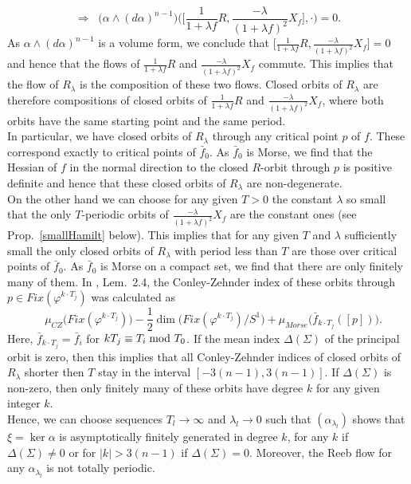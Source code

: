 \documentclass[a4paper,12pt,bibliography=totocnumbered,titlepage=false,abstracton,bookmarksnumbered=true]{scrartcl}
\theoremstyle{definition}
\begin{document}
 \[\Rightarrow\;\;\big(\alpha\wedge(d\alpha)^{n-1}\big)\Big(\big[{\textstyle\frac{1}{1+\lambda f}}R, {\textstyle\frac{-\lambda}{(1+\lambda f)^2}} X_{f}\big],\cdot\Big) =0.\]
As $\alpha{\wedge}(d\alpha)^{n-1}$ is a volume form, we conclude that $\big[{\textstyle\frac{1}{1+\lambda f}}R, {\textstyle\frac{-\lambda}{(1+\lambda f)^2}} X_{f}\big]=0$ and hence that the flows of $\frac{1}{1+\lambda f}R$ and $\frac{-\lambda}{(1+\lambda f)^2}X_f$ commute. This implies that the flow of $R_\lambda$ is the composition of these two flows. Closed orbits of $R_\lambda$ are therefore compositions of closed orbits of $\frac{1}{1+\lambda f}R$ and $\frac{-\lambda}{(1+\lambda f)^2}X_f$, where both orbits have the same starting point and the same period.\\
In particular, we have closed orbits of $R_\lambda$ through any critical point $p$ of $f$. These correspond exactly to critical points of $\bar{f}_0$. As $\bar{f}_0$ is Morse, we find that the Hessian of $f$ in the normal direction to the closed $R$-orbit through $p$ is positive definite and hence that these closed orbits of $R_\lambda$ are non-degenerate.\\
On the other hand we can choose for any given $T>0$ the constant $\lambda$ so small that the only $T$-periodic orbits of $\frac{-\lambda}{(1+\lambda f)^2}X_f$ are the constant ones (see Prop.\ \ref{smallHamilt} below). This implies that for any given $T$ and $\lambda$ sufficiently small the only closed orbits of $R_\lambda$ with period less than $T$ are those over critical points of $\bar{f}_0$. As $\bar{f}_0$ is Morse on a compact set, we find that there are only finitely many of them. In \cite{Bour}, Lem.\ 2.4, the Conley-Zehnder index of these orbits through $p\in Fix(\varphi^{k\cdot T_j})$ was calculated as 
\[\quad\mu_{CZ}\big(Fix(\varphi^{k\cdot T_j})\Big)-{\textstyle \frac{1}{2}}\dim\big(Fix(\varphi^{k\cdot T_j})\big/ S^1\big)+\mu_{Morse} \big(\bar{f}_{k\cdot T_j}([p])\big).\]
Here, $\bar{f}_{k\cdot T_j}=\bar{f}_i$ for $k T_j\equiv T_i \mspace{-7mu}\mod T_0$. If the mean index $\Delta(\Sigma)$ of the principal orbit is zero, then this implies that all Conley-Zehnder indices of closed orbits of $R_\lambda$ shorter then $T$ stay in the interval $[-3(n{-}1),3(n{-}1)]$. If $\Delta(\Sigma)$ is non-zero, then only finitely many of these orbits have degree $k$  for any given integer $k$.\\
Hence, we can choose sequences $T_l\rightarrow\infty$ and $\lambda_l\rightarrow 0$ such that $(\alpha_{\lambda_l})$ shows that $\xi=\ker \alpha$ is asymptotically finitely generated in degree $k$, for any $k$ if $\Delta(\Sigma)\neq 0$ or for $|k|>3(n{-}1)$ if $\Delta(\Sigma)=0$. Moreover, the Reeb flow for any $\alpha_{\lambda_l}$ is not totally periodic.\bigskip\\
\end{document}

